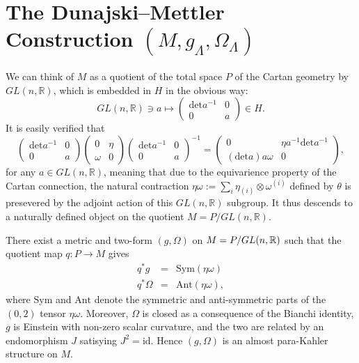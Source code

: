 \section{The Dunajski--Mettler Construction $(M,g_\Lambda,\Omega_\Lambda)$}

We can think of $M$ as a quotient of the total space $P$ of the
Cartan geometry by $GL(n,\mathbb{R})$, which is embedded in $H$
in the obvious way:
\[
GL(n,\mathbb{R})\ni a\longmapsto\begin{pmatrix}\mathrm{det}a^{-1} & 0\\
0 & a
\end{pmatrix}\in H.
\]
It is easily verified that 
\[
\begin{pmatrix}\mathrm{det}a^{-1} & 0\\
0 & a
\end{pmatrix}\begin{pmatrix}0 & \eta\\
\omega & 0
\end{pmatrix}\begin{pmatrix}\mathrm{det}a^{-1} & 0\\
0 & a
\end{pmatrix}^{-1}=\begin{pmatrix}0 & \eta a^{-1}\mathrm{det}a^{-1}\\
(\mathrm{det}a)a\omega & 0
\end{pmatrix},
\]
for any $a\in GL(n,\mathbb{R})$, meaning that due to the equivarience
property of the Cartan connection, the natural contraction $\eta\omega:=\sum_{i}\eta_{(i)}\otimes\omega^{(i)}$
defined by $\theta$ is presevered by the adjoint action of this $GL(n,\mathbb{R})$
subgroup. It thus descends to a naturally defined object on the quotient
$M=P/GL(n,\mathbb{R})$.

\begin{theo}{\cite{DM}}\label{thm:DM}
There exist a metric and two-form
$(g,\Omega)$ on $\mbox{\ensuremath{M=P/GL(n,\mathbb{R})}}$ such
that the quotient map $q:P\rightarrow M$ gives
\begin{eqnarray*}
q^{*}g & = & \mathrm{Sym}(\eta\omega)\\
q^{*}\Omega & = & \mathrm{Ant}(\eta\omega),
\end{eqnarray*}
where $\mathrm{Sym}$ and $\mathrm{Ant}$ denote the symmetric and
anti-symmetric parts of the $(0,2)$ tensor $\eta\omega$. Moreover,
$\Omega$ is closed as a consequence of the Bianchi identity, $g$
is Einstein with non-zero scalar curvature, and the two are related
by an endomorphism $J$ satisying $J^{2}=\mathrm{id}$. Hence $(g,\Omega)$
is an almost para-Kahler structure on $M$.
\end{theo}

